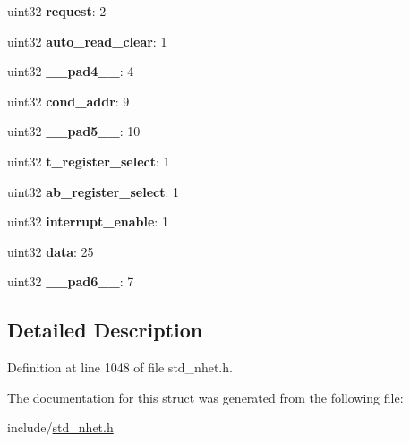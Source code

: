 \begin{DoxyCompactItemize}
\mbox{\label{structdjz__format_a13017835414e0756c2d8937069a2814a}} 
uint32 {\bfseries request}\+: 2
\item 
\mbox{\label{structdjz__format_af9d0ba64893a3b93454f7a60b69995b3}} 
uint32 {\bfseries auto\+\_\+read\+\_\+clear}\+: 1
\item 
\mbox{\label{structdjz__format_a83cdd69ceb3e4b00cc467e7f3982e941}} 
uint32 {\bfseries \+\_\+\+\_\+pad4\+\_\+\+\_\+}\+: 4
\item 
\mbox{\label{structdjz__format_aa756bb5843908776fc5477c098f542db}} 
uint32 {\bfseries cond\+\_\+addr}\+: 9
\item 
\mbox{\label{structdjz__format_a5fc7696387d6da234382476c4dab923f}} 
uint32 {\bfseries \+\_\+\+\_\+pad5\+\_\+\+\_\+}\+: 10
\item 
\mbox{\label{structdjz__format_a46e952837d2431d90779f50256218d7c}} 
uint32 {\bfseries t\+\_\+register\+\_\+select}\+: 1
\item 
\mbox{\label{structdjz__format_ac0dcc970867b7f9c0a669f268eb04a01}} 
uint32 {\bfseries ab\+\_\+register\+\_\+select}\+: 1
\item 
\mbox{\label{structdjz__format_aa236846aaaceb67d238c6b9d804fbd14}} 
uint32 {\bfseries interrupt\+\_\+enable}\+: 1
\item 
\mbox{\label{structdjz__format_a111205a07891fbc2f3a8ff36be0f18da}} 
uint32 {\bfseries data}\+: 25
\item 
\mbox{\label{structdjz__format_a4b8b9a4f0e1994bd727c138798beade4}} 
uint32 {\bfseries \+\_\+\+\_\+pad6\+\_\+\+\_\+}\+: 7
\end{DoxyCompactItemize}


\subsection{Detailed Description}


Definition at line 1048 of file std\+\_\+nhet.\+h.



The documentation for this struct was generated from the following file\+:\begin{DoxyCompactItemize}
\item 
include/\mbox{\hyperlink{std__nhet_8h}{std\+\_\+nhet.\+h}}\end{DoxyCompactItemize}
